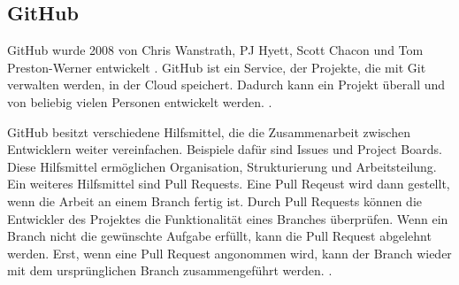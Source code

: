 \subsection{GitHub}\label{sub:t_git_gh}
GitHub wurde 2008 von Chris Wanstrath, PJ Hyett, Scott Chacon und Tom
Preston-Werner entwickelt \cite{noauthor_github_2021}. GitHub ist ein Service,
der Projekte, die mit Git verwalten werden, in der Cloud speichert. Dadurch kann
ein Projekt überall und von beliebig vielen Personen entwickelt werden.
\cite{noauthor_github_2021}.
 
GitHub besitzt verschiedene Hilfsmittel, die die Zusammenarbeit zwischen
Entwicklern weiter vereinfachen. Beispiele dafür sind
\guillemotleft{}Issues\guillemotright{} und \guillemotleft{}Project
Boards\guillemotright{}. Diese Hilfsmittel ermöglichen Organisation,
Strukturierung und Arbeitsteilung. Ein weiteres Hilfsmittel sind Pull Requests.
Eine Pull Reqeust wird dann gestellt, wenn die Arbeit an einem Branch fertig
ist. Durch Pull Requests können die Entwickler des Projektes die Funktionalität
eines Branches überprüfen. Wenn ein Branch nicht die gewünschte Aufgabe erfüllt,
kann die Pull Request abgelehnt werden. Erst, wenn eine Pull Request angonommen
wird, kann der Branch wieder mit dem ursprünglichen Branch zusammengeführt
werden. \cite{atlassian_pull_nodate}.